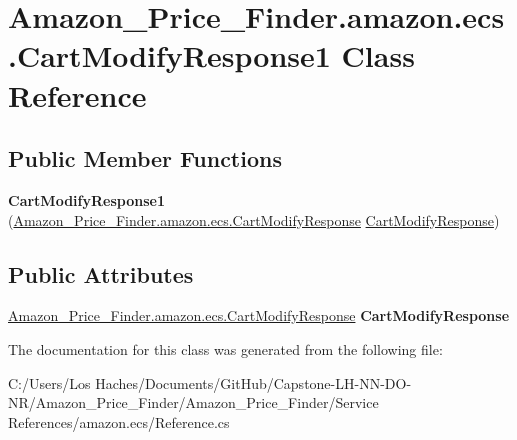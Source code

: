 \hypertarget{class_amazon___price___finder_1_1amazon_1_1ecs_1_1_cart_modify_response1}{\section{Amazon\-\_\-\-Price\-\_\-\-Finder.\-amazon.\-ecs.\-Cart\-Modify\-Response1 Class Reference}
\label{class_amazon___price___finder_1_1amazon_1_1ecs_1_1_cart_modify_response1}
}
\subsection*{Public Member Functions}
\begin{DoxyCompactItemize}
\item 
\hypertarget{class_amazon___price___finder_1_1amazon_1_1ecs_1_1_cart_modify_response1_a7c0ffb0c2d4ad7dff8db94a61e987dcd}{{\bfseries Cart\-Modify\-Response1} (\hyperlink{class_amazon___price___finder_1_1amazon_1_1ecs_1_1_cart_modify_response}{Amazon\-\_\-\-Price\-\_\-\-Finder.\-amazon.\-ecs.\-Cart\-Modify\-Response} \hyperlink{class_amazon___price___finder_1_1amazon_1_1ecs_1_1_cart_modify_response}{Cart\-Modify\-Response})}\label{class_amazon___price___finder_1_1amazon_1_1ecs_1_1_cart_modify_response1_a7c0ffb0c2d4ad7dff8db94a61e987dcd}

\end{DoxyCompactItemize}
\subsection*{Public Attributes}
\begin{DoxyCompactItemize}
\item 
\hypertarget{class_amazon___price___finder_1_1amazon_1_1ecs_1_1_cart_modify_response1_ae383dbfc0020f3173c90255b8f17efc6}{\hyperlink{class_amazon___price___finder_1_1amazon_1_1ecs_1_1_cart_modify_response}{Amazon\-\_\-\-Price\-\_\-\-Finder.\-amazon.\-ecs.\-Cart\-Modify\-Response} {\bfseries Cart\-Modify\-Response}}\label{class_amazon___price___finder_1_1amazon_1_1ecs_1_1_cart_modify_response1_ae383dbfc0020f3173c90255b8f17efc6}

\end{DoxyCompactItemize}


The documentation for this class was generated from the following file\-:\begin{DoxyCompactItemize}
\item 
C\-:/\-Users/\-Los Haches/\-Documents/\-Git\-Hub/\-Capstone-\/\-L\-H-\/\-N\-N-\/\-D\-O-\/\-N\-R/\-Amazon\-\_\-\-Price\-\_\-\-Finder/\-Amazon\-\_\-\-Price\-\_\-\-Finder/\-Service References/amazon.\-ecs/Reference.\-cs\end{DoxyCompactItemize}

